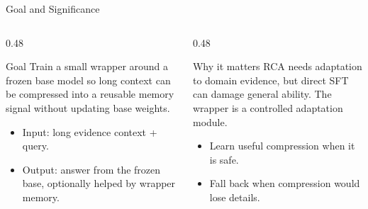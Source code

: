 \begin{frame}{Goal and Significance}
  \begin{columns}[T]
    \begin{column}{0.48\textwidth}
      \begin{block}{Goal}
        Train a small wrapper around a frozen base model so long context can be
        compressed into a reusable memory signal without updating base weights.
      \end{block}
      \begin{itemize}
        \item Input: long evidence context + query.
        \item Output: answer from the frozen base, optionally helped by wrapper memory.
      \end{itemize}
    \end{column}
    \begin{column}{0.48\textwidth}
      \begin{block}{Why it matters}
        RCA needs adaptation to domain evidence, but direct SFT can damage
        general ability. The wrapper is a controlled adaptation module.
      \end{block}
      \begin{itemize}
        \item Learn useful compression when it is safe.
        \item Fall back when compression would lose details.
      \end{itemize}
    \end{column}
  \end{columns}
\end{frame}

